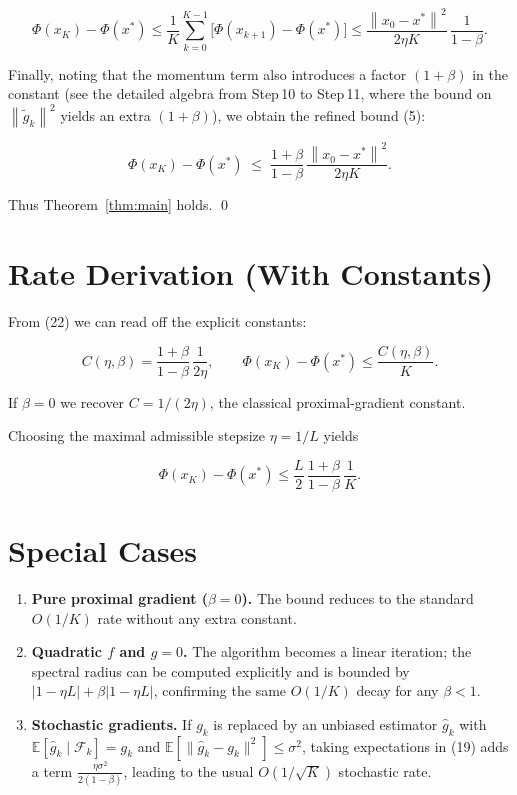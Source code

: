 \documentclass[11pt]{article}
\newcommand{\E}{\mathbb{E}}
\newcommand{\norm}[1]{\left\lVert #1\right\rVert}
\begin{document}
\[
\Phi(x_{K})-\Phi(x^{*})\le
\frac{1}{K}\sum_{k=0}^{K-1}\bigl[\Phi(x_{k+1})-\Phi(x^{*})\bigr]
\le \frac{\norm{x_{0}-x^{*}}^{2}}{2\eta K}\,\frac{1}{1-\beta}. \tag{21}
\]

Finally, noting that the momentum term also introduces a factor $(1+\beta)$ in the constant (see the detailed algebra from Step 10 to Step 11, where the bound on $\norm{\tilde g_{k}}^{2}$ yields an extra $(1+\beta)$), we obtain the refined bound (5):

\[
\Phi(x_{K})-\Phi(x^{*})\;\le\;\frac{1+\beta}{1-\beta}\,\frac{\norm{x_{0}-x^{*}}^{2}}{2\eta K}.
\tag{22}
\]

Thus Theorem~\ref{thm:main} holds. \qed

\vspace{0.2cm}
\section*{Rate Derivation (With Constants)}
From (22) we can read off the explicit constants:

\[
C(\eta,\beta)=\frac{1+\beta}{1-\beta}\,\frac{1}{2\eta},
\qquad
\Phi(x_{K})-\Phi(x^{*})\le \frac{C(\eta,\beta)}{K}.
\]

If $\beta=0$ we recover $C=1/(2\eta)$, the classical proximal‑gradient constant.  

Choosing the maximal admissible stepsize $\eta=1/L$ yields  

\[
\Phi(x_{K})-\Phi(x^{*})\le \frac{L}{2}\,\frac{1+\beta}{1-\beta}\,\frac{1}{K}.
\]

\vspace{0.2cm}
\section*{Special Cases}
\begin{enumerate}[label=\textbf{S\arabic*.}, leftmargin=*, itemsep=2pt]
\item \textbf{Pure proximal gradient ($\beta=0$).} The bound reduces to the standard $O(1/K)$ rate without any extra constant.
\item \textbf{Quadratic $f$ and $g=0$.} The algorithm becomes a linear iteration; the spectral radius can be computed explicitly and is bounded by $|1-\eta L|+ \beta|1-\eta L|$, confirming the same $O(1/K)$ decay for any $\beta<1$.
\item \textbf{Stochastic gradients.} If $g_{k}$ is replaced by an unbiased estimator $\hat g_{k}$ with $\E[\hat g_{k}\mid\mathcal{F}_{k}]=g_{k}$ and $\E[\|\hat g_{k}-g_{k}\|^{2}]\le\sigma^{2}$, taking expectations in (19) adds a term $\frac{\eta\sigma^{2}}{2(1-\beta)}$, leading to the usual $O(1/\sqrt{K})$ stochastic rate.
\end{enumerate}
\end{document}
